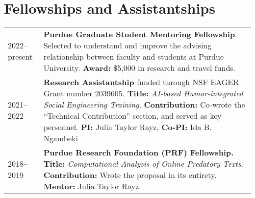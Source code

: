 \documentclass[11pt]{article}
\begin{document}
\section*{Fellowships and Assistantships}
\vspace{-.5em}
\renewcommand*{\arraystretch}{1.5}
\begin{tabularx}{\textwidth}{@{}p{} X}
2022--present & \textbf{Purdue Graduate Student Mentoring Fellowship}. Selected to understand and improve the advising relationship between faculty and students at Purdue University. \textbf{Award:} \$5{,}000 in research and travel funds.\\
2021--2022 & \textbf{Research Assistantship} funded through NSF EAGER Grant number 2039605. \textbf{Title:} \emph{AI-based Humor-integrated Social Engineering Training}. \textbf{Contribution:} Co-wrote the ``Technical Contribution'' section, and served as key personnel. \textbf{PI:} Julia Taylor Rayz, \textbf{Co-PI:} Ida B. Ngambeki \\
2018--2019 & \textbf{Purdue Research Foundation (PRF) Fellowship.} \textbf{Title:} \textit{Computational Analysis of Online Predatory Texts}. \textbf{Contribution:} Wrote the proposal in its entirety. \textbf{Mentor:} Julia Taylor Rayz.\\
\end{tabularx}

\renewcommand*{\arraystretch}{1}
\end{document}
